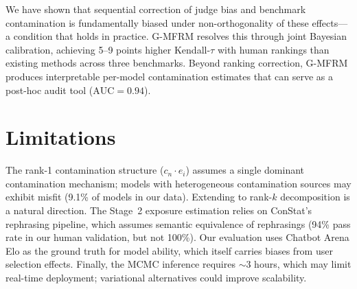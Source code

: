\documentclass[11pt,a4paper]{article}
\begin{document}
We have shown that sequential correction of judge bias and benchmark contamination is fundamentally biased under non-orthogonality of these effects---a condition that holds in practice. G-MFRM resolves this through joint Bayesian calibration, achieving 5--9 points higher Kendall-$\tau$ with human rankings than existing methods across three benchmarks. Beyond ranking correction, G-MFRM produces interpretable per-model contamination estimates that can serve as a post-hoc audit tool ($\text{AUC} = 0.94$).

\section*{Limitations}

The rank-1 contamination structure ($c_n \cdot e_i$) assumes a single dominant contamination mechanism; models with heterogeneous contamination sources may exhibit misfit (9.1\% of models in our data). Extending to rank-$k$ decomposition is a natural direction. The Stage~2 exposure estimation relies on ConStat's rephrasing pipeline, which assumes semantic equivalence of rephrasings (94\% pass rate in our human validation, but not 100\%). Our evaluation uses Chatbot Arena Elo as the ground truth for model ability, which itself carries biases from user selection effects. Finally, the MCMC inference requires $\sim$3 hours, which may limit real-time deployment; variational alternatives could improve scalability.


\end{document}
